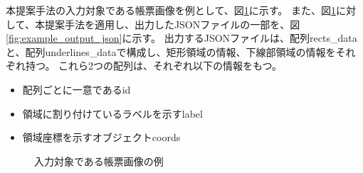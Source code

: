 本提案手法の入力対象である帳票画像を例として、図\ref{fig:original}に示す。
また、図\ref{fig:original}に対して、本提案手法を適用し、出力したJSONファイルの一部を、図\ref{fig:example_output_json}に示す。
出力するJSONファイルは、配列rects\_dataと、配列underlines\_dataで構成し、矩形領域の情報、下線部領域の情報をそれぞれ持つ。
これら2つの配列は、それぞれ以下の情報をもつ。

\begin{itemize}
    \item 配列ごとに一意であるid
    \item 領域に割り付けているラベルを示すlabel
    \item 領域座標を示すオブジェクトcoords
\end{itemize}

\begin{figure}[t]
    \begin{center}
        \caption{入力対象である帳票画像の例}
        \label{fig:original}
    \end{center}
\end{figure}


